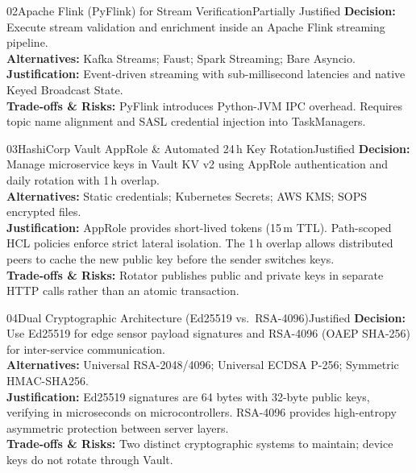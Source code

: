 \documentclass[10pt,a4paper]{report}
\begin{document}
\begin{adrbox}{02}{Apache Flink (PyFlink) for Stream Verification}{Partially Justified}
\textbf{Decision:} Execute stream validation and enrichment inside an Apache Flink streaming pipeline.\\
\textbf{Alternatives:} Kafka Streams; Faust; Spark Streaming; Bare Asyncio.\\
\textbf{Justification:} Event-driven streaming with sub-millisecond latencies and native Keyed Broadcast State.\\
\textbf{Trade-offs \& Risks:} PyFlink introduces Python-JVM IPC overhead. Requires topic name alignment and SASL credential injection into TaskManagers.
\end{adrbox}

\begin{adrbox}{03}{HashiCorp Vault AppRole \& Automated 24\,h Key Rotation}{Justified}
\textbf{Decision:} Manage microservice keys in Vault KV v2 using AppRole authentication and daily rotation with 1\,h overlap.\\
\textbf{Alternatives:} Static credentials; Kubernetes Secrets; AWS KMS; SOPS encrypted files.\\
\textbf{Justification:} AppRole provides short-lived tokens (15\,m TTL). Path-scoped HCL policies enforce strict lateral isolation. The 1\,h overlap allows distributed peers to cache the new public key before the sender switches keys.\\
\textbf{Trade-offs \& Risks:} Rotator publishes public and private keys in separate HTTP calls rather than an atomic transaction.
\end{adrbox}

\begin{adrbox}{04}{Dual Cryptographic Architecture (Ed25519 vs.\ RSA-4096)}{Justified}
\textbf{Decision:} Use Ed25519 for edge sensor payload signatures and RSA-4096 (OAEP SHA-256) for inter-service communication.\\
\textbf{Alternatives:} Universal RSA-2048/4096; Universal ECDSA P-256; Symmetric HMAC-SHA256.\\
\textbf{Justification:} Ed25519 signatures are 64 bytes with 32-byte public keys, verifying in microseconds on microcontrollers. RSA-4096 provides high-entropy asymmetric protection between server layers.\\
\textbf{Trade-offs \& Risks:} Two distinct cryptographic systems to maintain; device keys do not rotate through Vault.
\end{adrbox}
\end{document}
